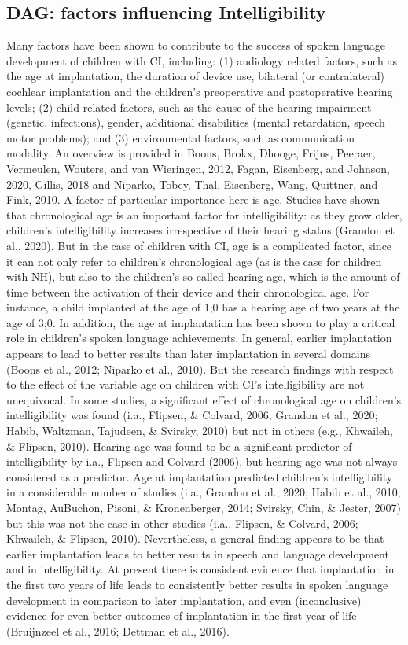 \subsection{DAG: factors influencing Intelligibility}
%
Many factors have been shown to contribute to the success of spoken language development of children with CI, including: (1) audiology related factors, such as the age at implantation, the duration of device use, bilateral (or contralateral) cochlear implantation and the children’s preoperative and postoperative hearing levels; (2) child related factors, such as the cause of the hearing impairment (genetic, infections), gender, additional disabilities (mental retardation, speech motor problems); and (3) environmental factors, such as communication modality. An overview is provided in Boons, Brokx, Dhooge, Frijns, Peeraer, Vermeulen, Wouters, and van Wieringen, 2012, Fagan,
Eisenberg, and Johnson, 2020, Gillis, 2018 and Niparko, Tobey, Thal, Eisenberg, Wang,
Quittner, and Fink, 2010. A factor of particular importance here is age. Studies have shown
that chronological age is an important factor for intelligibility: as they grow older, children’s intelligibility increases irrespective of their hearing status (Grandon et al., 2020). But in the case of children with CI, age is a complicated factor, since it can not only refer to children’s chronological age (as is the case for children with NH), but also to the children’s so-called hearing age, which is the amount of time between the activation of their device and their chronological age. For instance, a child implanted at the age of 1;0 has a hearing age of two years at the age of 3;0. In addition, the age at implantation has been shown to play a critical role in children’s spoken language achievements. In general, earlier implantation appears to lead to better results than later implantation in several domains (Boons et al., 2012; Niparko et al., 2010). But the research findings with respect to the effect of the variable age on children with CI’s intelligibility are not unequivocal. In some studies, a significant effect of chronological age on children’s intelligibility was found (i.a., Flipsen, \& Colvard, 2006;
Grandon et al., 2020; Habib, Waltzman, Tajudeen, \& Svirsky, 2010) but not in others (e.g.,
Khwaileh, \& Flipsen, 2010). Hearing age was found to be a significant predictor of intelligibility by i.a., Flipsen and Colvard (2006), but hearing age was not always considered as a predictor. Age at implantation predicted children’s intelligibility in a considerable number of studies (i.a., Grandon et al., 2020; Habib et al., 2010; Montag, AuBuchon, Pisoni, \& Kronenberger, 2014; Svirsky, Chin, \& Jester, 2007) but this was not the case in other studies (i.a., Flipsen, \& Colvard, 2006; Khwaileh, \& Flipsen, 2010). Nevertheless, a general finding appears to be that earlier implantation leads to better results in speech and language development and in intelligibility. At present there is consistent evidence that implantation in the first two years of life leads to consistently better results in spoken language development in comparison to later implantation, and even (inconclusive) evidence for even better outcomes of implantation in the first year of life (Bruijnzeel et al., 2016; Dettman et al., 2016).
